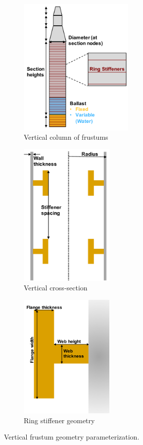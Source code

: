 \begin{figure}
  \begin{subfigure}[b]{0.38\linewidth}
    \centering \includegraphics[width=2.2in]{figs/colGeom.pdf}
    \caption{Vertical column of frustums}
  \end{subfigure}
  \begin{subfigure}[b]{0.29\linewidth}
    \centering \includegraphics[width=1.8in]{figs/stiffenerCut.pdf}
    \caption{Vertical cross-section}
  \end{subfigure}
  \begin{subfigure}[b]{0.29\linewidth}
    \centering \includegraphics[width=1.8in]{figs/stiffenerZoom.pdf}
    \caption{Ring stiffener geometry}
  \end{subfigure}
  \caption{Vertical frustum geometry parameterization.}
  \label{fig:column}
\end{figure}

